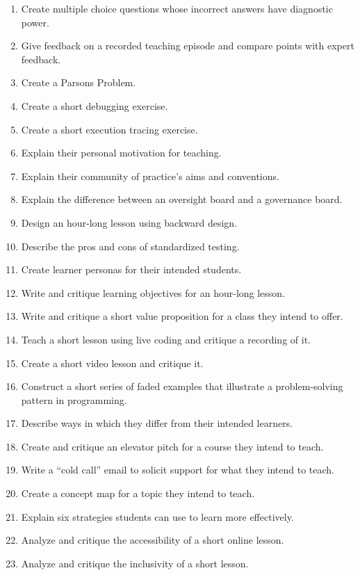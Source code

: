\begin{enumerate}
\item
  Create multiple choice questions whose incorrect answers have
  diagnostic power.
\item
  Give feedback on a recorded teaching episode and compare points with
  expert feedback.
\item
  Create a Parsons Problem.
\item
  Create a short debugging exercise.
\item
  Create a short execution tracing exercise.
\item
  Explain their personal motivation for teaching.
\item
  Explain their community of practice's aims and conventions.
\item
  Explain the difference between an oversight board and a governance
  board.
\item
  Design an hour-long lesson using backward design.
\item
  Describe the pros and cons of standardized testing.
\item
  Create learner personas for their intended students.
\item
  Write and critique learning objectives for an hour-long lesson.
\item
  Write and critique a short value proposition for a class they intend
  to offer.
\item
  Teach a short lesson using live coding and critique a recording of
  it.
\item
  Create a short video lesson and critique it.
\item
  Construct a short series of faded examples that illustrate a
  problem-solving pattern in programming.
\item
  Describe ways in which they differ from their intended learners.
\item
  Create and critique an elevator pitch for a course they intend to
  teach.
\item
  Write a ``cold call'' email to solicit support for what they intend to
  teach.
\item
  Create a concept map for a topic they intend to teach.
\item
  Explain six strategies students can use to learn more effectively.
\item
  Analyze and critique the accessibility of a short online lesson.
\item
  Analyze and critique the inclusivity of a short lesson.

\end{enumerate}
